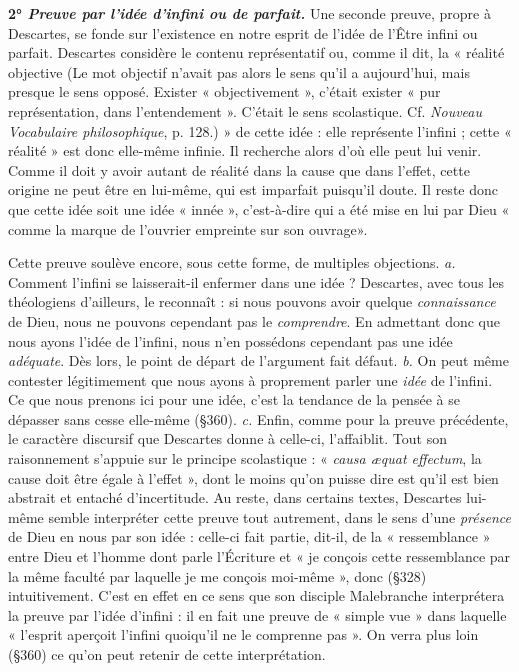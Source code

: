 {\textbf{2° \textit {\textsf{Preuve par l'idée d'infini ou de parfait.}}}
Une seconde preuve, propre à
Descartes, se fonde sur l'existence en notre esprit de l’idée de l'Être
infini ou parfait. Descartes considère le contenu représentatif ou, comme
il dit, la « réalité objective
{\footnotesize (Le mot {\it }objectif n'avait pas alors le sens qu'il a aujourd’hui, mais presque le sens
opposé. Exister « objectivement », c'était exister « pur représentation, dans l'entendement ».
C'était le sens scolastique. Cf. {\it Nouveau Vocabulaire philosophique}, p. 128.)}
» de cette idée : elle représente l’infini ; cette
« réalité » est donc elle-même infinie. Il recherche alors d'où elle peut lui
venir. Comme il doit y avoir autant de réalité dans la cause que dans l'effet,
cette origine ne peut être en lui-même, qui est imparfait puisqu'il doute.
Il reste donc que cette idée soit une idée « innée », c’est-à-dire qui a été mise
en lui par Dieu « comme la marque de l’ouvrier empreinte sur son ouvrage».

Cette preuve soulève encore, sous cette forme, de multiples objections.
{\it a.} Comment l'infini se laisserait-il enfermer dans une idée ? Descartes, avec
tous les théologiens d’ailleurs, le reconnaît : si nous pouvons avoir quelque
{\it connaissance} de Dieu, nous ne pouvons cependant pas le {\it comprendre}.
En admettant donc que nous ayons l’idée de l'infini, nous n’en possédons
cependant pas une idée {\it adéquate}. Dès lors, le point de départ de l’argument
fait défaut. {\it b.} On peut même contester légitimement que nous
ayons à proprement parler une {\it idée} de l'infini. Ce que nous prenons ici
pour une idée, c’est la tendance de la pensée à se dépasser sans cesse elle-même
(\S 360). {\it c.} Enfin, comme pour la preuve précédente, le caractère discursif
que Descartes donne à celle-ci, l’affaiblit. Tout son raisonnement
s'appuie sur le principe scolastique : « {\it causa æquat effectum}, la cause doit
être égale à l’effet », dont le moins qu’on puisse dire est qu’il est bien abstrait
et entaché d'incertitude. Au reste, dans certains textes, Descartes lui-même
semble interpréter cette preuve tout autrement, dans le sens d’une {\it présence}
de Dieu en nous par son idée : celle-ci fait partie, dit-il, de la « ressemblance »
entre Dieu et l’homme dont parle l'Écriture et « je conçois cette
ressemblance par la même faculté par laquelle je me conçois moi-même »,
donc (\S 328) intuitivement. C’est en effet en ce sens que son disciple Malebranche
interprétera la preuve par l’idée d’infini : il en fait une preuve
de « simple vue » dans laquelle « l'esprit aperçoit l'infini quoiqu'il ne le
comprenne pas ». On verra plus loin (\S 360) ce qu’on peut retenir de cette
interprétation.}
\vspace{0.31cm}

